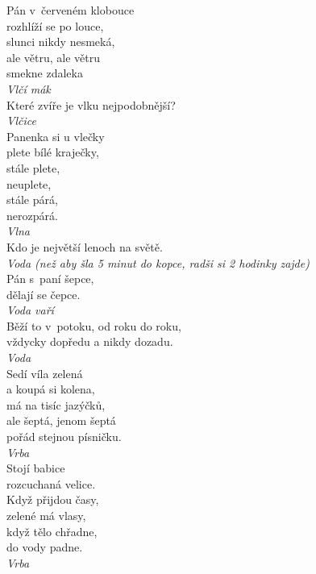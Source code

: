 \begin{multicols}{\value{columnsthindata}}
\noindent
Pán v~červeném klobouce\\
rozhlíží se po louce,\\
slunci nikdy nesmeká,\\
ale větru, ale větru\\
smekne zdaleka\\[1 mm]
{\sl Vlčí mák}\\

\noindent
Které zvíře je vlku nejpodobnější?\\[1 mm]
{\sl Vlčice}\\

\noindent
Panenka si u vlečky\\
plete bílé kraječky,\\
stále plete,\\
neuplete,\\
stále párá,\\
nerozpárá.\\[1 mm]
{\sl Vlna}\\

\noindent
Kdo je největší lenoch na světě.\\[1 mm]
{\sl Voda (než aby šla 5 minut do kopce, radši si 2 hodinky zajde)}\\

\noindent
Pán s~paní šepce,\\
dělají se čepce.\\[1 mm]
{\sl Voda vaří}\\

\noindent
Běží to v~potoku, od roku do roku,\\
vždycky dopředu a nikdy dozadu.\\[1 mm]
{\sl Voda}\\

\noindent
Sedí víla zelená\\
a koupá si kolena,\\
má na tisíc jazýčků,\\
ale šeptá, jenom šeptá\\
pořád stejnou písničku.\\[1 mm]
{\sl Vrba}\\

\noindent
Stojí babice\\
rozcuchaná velice.\\
Když přijdou časy,\\
zelené má vlasy,\\
když tělo chřadne,\\
do vody padne.\\[1 mm]
{\sl Vrba}\\


\end{multicols}

